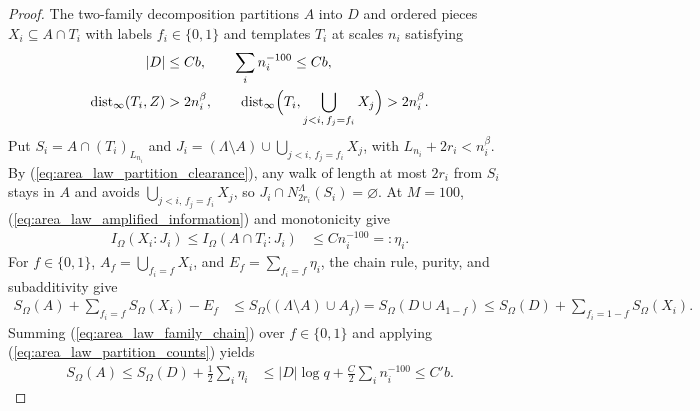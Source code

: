 \begin{proof}
    The two-family decomposition partitions $A$ into $D$ and ordered pieces
    $X_i\subseteq A\cap T_i$ with labels $f_i\in\{0,1\}$ and templates $T_i$ at
    scales $n_i$ satisfying
    \begin{align}
        |D| & \le Cb,
        \qquad
        \sum_in_i^{-100}\le Cb,
        \label{eq:area_law_partition_counts} \\
        \operatorname{dist}_\infty(T_i,Z)
            & >2n_i^\beta,
        \qquad
        \operatorname{dist}_\infty\Bigl(T_i,
        \bigcup_{j<i,\,f_j=f_i}X_j\Bigr)>2n_i^\beta.
        \label{eq:area_law_partition_clearance}
    \end{align}
    Put $S_i=A\cap(T_i)_{L_{n_i}}$ and
    $J_i=(\Lambda\setminus A)\cup\bigcup_{j<i,\,f_j=f_i}X_j$, with $L_{n_i}+2r_i<n_i^\beta$.
    By (\ref{eq:area_law_partition_clearance}), any walk of length at most
    $2r_i$ from $S_i$ stays in $A$ and avoids $\bigcup_{j<i,\,f_j=f_i}X_j$, so
    $J_i\cap N_{2r_i}^\Lambda(S_i)=\varnothing$. At $M=100$,
    (\ref{eq:area_law_amplified_information}) and monotonicity give
    \begin{align}
        I_\Omega(X_i:J_i)\le I_\Omega(A\cap T_i:J_i)
         & \le Cn_i^{-100}=:\eta_i.
        \label{eq:area_law_piece_information}
    \end{align}
    For $f\in\{0,1\}$, $A_f=\bigcup_{f_i=f}X_i$, and $E_f=\sum_{f_i=f}\eta_i$,
    the chain rule, purity, and subadditivity give
    \begin{align}
        S_\Omega(A)+\sum_{f_i=f}S_\Omega(X_i)-E_f
         & \le S_\Omega\bigl((\Lambda\setminus A)\cup A_f\bigr)
        =S_\Omega(D\cup A_{1-f})
        \le S_\Omega(D)+\sum_{f_i=1-f}S_\Omega(X_i).
        \label{eq:area_law_family_chain}
    \end{align}
    Summing (\ref{eq:area_law_family_chain}) over $f\in\{0,1\}$ and applying
    (\ref{eq:area_law_partition_counts}) yields
    \begin{align}
        S_\Omega(A)\le S_\Omega(D)+\frac12\sum_i\eta_i
         & \le|D|\log q+\frac C2\sum_in_i^{-100}\le C'b.
        \label{eq:area_law_final_bound}
    \end{align}
\end{proof}

